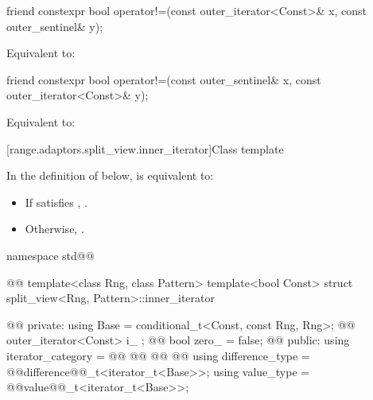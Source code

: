 {{%
\begin{itemdecl}
friend constexpr bool operator!=(const outer_iterator<Const>& x, const outer_sentinel& y);
\end{itemdecl}

\begin{itemdescr}
\pnum
\effects Equivalent to: 
\end{itemdescr}

%
\begin{itemdecl}
friend constexpr bool operator!=(const outer_sentinel& x, const outer_iterator<Const>& y);
\end{itemdecl}

\begin{itemdescr}
\pnum
\effects Equivalent to: 
\end{itemdescr}
} %

[range.adaptors.split_view.inner_iterator]{Class template }

\pnum
\begin{note}
\end{note}

{\color{oldclr}
\pnum
In the definition of  below,
 is equivalent to:
\begin{itemize}
\item If  satisfies , .

\item Otherwise, .
\end{itemize}
} %

\begin{codeblock}
namespace std@@ { @@
  template<class Rng, class Pattern>
  template<bool Const>
  struct split_view<Rng, Pattern>::inner_iterator { @\newtxt{// \expos}@
  private:
    using Base =
      conditional_t<Const, const Rng, Rng>; @\newtxt{// \expos}@
    outer_iterator<Const> i_ {};            @\newtxt{// \expos}@
    bool zero_ = false;                     @@
  public:
    using iterator_category = @\newtxt{\seebelownc;}@
      @@
    @@
      @@
    using difference_type = @@difference@@_t<iterator_t<Base>>;
    using value_type = @@value@@_t<iterator_t<Base>>;

}}
\end{codeblock}}
